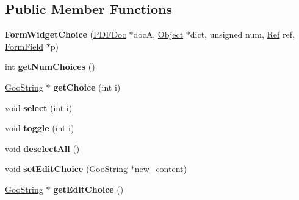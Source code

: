 \subsection*{Public Member Functions}
\begin{DoxyCompactItemize}
\item 
\mbox{\label{class_form_widget_choice_ae4dc902f7ce4d910014968c8de2c38d7}} 
{\bfseries Form\+Widget\+Choice} (\hyperlink{class_p_d_f_doc}{P\+D\+F\+Doc} $\ast$docA, \hyperlink{class_object}{Object} $\ast$dict, unsigned num, \hyperlink{struct_ref}{Ref} ref, \hyperlink{class_form_field}{Form\+Field} $\ast$p)
\item 
\mbox{\label{class_form_widget_choice_ac23ff57a3b7f4d50b1e940c09aa1084d}} 
int {\bfseries get\+Num\+Choices} ()
\item 
\mbox{\label{class_form_widget_choice_a96a8d6bc28baac8a897d3fefb643e4d8}} 
\hyperlink{class_goo_string}{Goo\+String} $\ast$ {\bfseries get\+Choice} (int i)
\item 
\mbox{\label{class_form_widget_choice_a4fd98a5dfecc77cb7b01b7b7e62eed52}} 
void {\bfseries select} (int i)
\item 
\mbox{\label{class_form_widget_choice_a64f97a14c8361c4778c5dc7a46fcea73}} 
void {\bfseries toggle} (int i)
\item 
\mbox{\label{class_form_widget_choice_a62432be3a5c0f20cb980408619e920d4}} 
void {\bfseries deselect\+All} ()
\item 
\mbox{\label{class_form_widget_choice_a7926afa347f23bbe90c1c9159e6e7970}} 
void {\bfseries set\+Edit\+Choice} (\hyperlink{class_goo_string}{Goo\+String} $\ast$new\+\_\+content)
\item 
\mbox{\label{class_form_widget_choice_ac2a6c15b68280642995b866c87b4f8ce}} 
\hyperlink{class_goo_string}{Goo\+String} $\ast$ {\bfseries get\+Edit\+Choice} ()
\item 
\mbox{\label{class_form_widget_choice_ab63e77995b40429812e6a5af46806899}} 

\end{DoxyCompactItemize}
